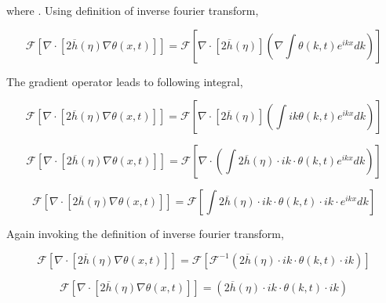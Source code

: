 \documentclass[a4paper,11pt,dvipsnames]{article}
\begin{document}
where . 
Using definition of inverse fourier transform, 

\begin{equation}
\mathcal{F} \left [ \nabla \cdot \left [ 2 \overline{h}(\eta) \nabla \theta (x,t) \right ] \right ] = 
\mathcal{F} \left [ \nabla \cdot \left [ 2 \overline{h}(\eta) \right ] \left ( \nabla \int \theta (k,t) e^{ikx} dk \right ) \right ] \label{eq:6}
\end{equation}

The gradient operator leads to following integral, 

\begin{equation}
\mathcal{F} \left [ \nabla \cdot \left [ 2 \overline{h}(\eta) \nabla \theta (x,t) \right ] \right ] = 
\mathcal{F} \left [ \nabla \cdot \left [ 2 \overline{h}(\eta) \right ] \left ( \int ik \theta (k,t) e^{ikx} dk \right ) \right ] \label{eq:7}
\end{equation}

\begin{equation}
\mathcal{F} \left [ \nabla \cdot \left [ 2 \overline{h}(\eta) \nabla \theta (x,t) \right ] \right ] = 
\mathcal{F} \left [ \nabla \cdot \left ( \int 2 \overline{h} (\eta) \cdot ik \cdot \theta (k,t) e^{ikx} dk \right ) \right ] \label{eq:8}
\end{equation}

\begin{equation}
\mathcal{F} \left [ \nabla \cdot \left [ 2 \overline{h}(\eta) \nabla \theta (x,t) \right ] \right ] = 
\mathcal{F} \left [ \int 2 \overline{h} (\eta) \cdot ik \cdot \theta (k,t) \cdot ik \cdot e^{ikx} dk \right ] \label{eq:9}
\end{equation}

Again invoking the definition of inverse fourier transform,

\begin{equation}
\mathcal{F} \left [ \nabla \cdot \left [ 2 \overline{h}(\eta) \nabla \theta (x,t) \right ] \right ] = 
\mathcal{F} \left [ \mathcal{F}^{-1} \left ( 2 \overline{h} (\eta) \cdot ik \cdot \theta (k,t) \cdot ik \right ) \right ] \label{eq:10}
\end{equation}

\begin{equation}
\mathcal{F} \left [ \nabla \cdot \left [ 2 \overline{h}(\eta) \nabla \theta (x,t) \right ] \right ] = 
\left ( 2 \overline{h} (\eta) \cdot ik \cdot \theta (k,t) \cdot ik \right ) \label{eq:11}
\end{equation}
\end{document}
